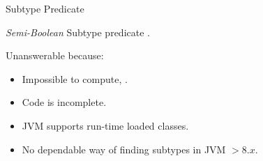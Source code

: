 \begin{frame}{Subtype Predicate}

  \emph{Semi-Boolean} Subtype predicate .

  \usebox\subtypebox

  Unanswerable because:
  \begin{itemize}
  \item Impossible to compute, \eg {}.
  \item Code is incomplete.
  \item JVM supports run-time loaded classes.
  \item No dependable way of finding subtypes in JVM $> 8.x$.
  \end{itemize}

\end{frame}

